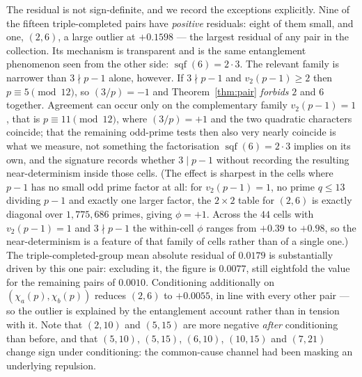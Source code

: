\documentclass[11pt,reqno]{amsart}
\theoremstyle{plain}
\theoremstyle{definition}
\DeclareMathOperator{\sqf}{sqf}
\begin{document}
The residual is not sign-definite, and we record the exceptions explicitly.
Nine of the fifteen triple-completed pairs have \emph{positive} residuals: eight of
them small, and one, $(2,6)$, a large outlier at $+0.1598$ --- the largest
residual of any pair in the collection. Its mechanism is transparent and is the same
entanglement phenomenon seen from the other side: $\sqf(6) = 2 \cdot 3$. The relevant family is narrower than $3 \nmid p-1$ alone, however. If $3 \nmid p-1$ and $v_2(p-1) \ge 2$ then $p \equiv 5 \pmod{12}$, so $(3/p) = -1$ and Theorem~\ref{thm:pair} \emph{forbids} $2$ and $6$ together. Agreement can occur only on the complementary family $v_2(p-1) = 1$, that is $p \equiv 11 \pmod{12}$, where $(3/p) = +1$ and the two quadratic characters coincide; that the remaining odd-prime tests then also very nearly coincide is what we measure, not something the factorisation $\sqf(6) = 2 \cdot 3$ implies on its own, and the signature records whether $3 \mid p-1$ without recording the
resulting near-determinism inside those cells. (The effect is sharpest in the cells where $p-1$ has no small odd prime factor
at all: for $v_2(p-1) = 1$, no prime $q \le 13$ dividing $p-1$ and exactly one
larger factor, the $2 \times 2$ table for $(2,6)$ is exactly diagonal over
$1{,}775{,}686$ primes, giving $\phi = +1$. Across the $44$ cells with
$v_2(p-1) = 1$ and $3 \nmid p-1$ the within-cell $\phi$ ranges from $+0.39$ to
$+0.98$, so the near-determinism is a feature of that family of cells rather
than of a single one.) The triple-completed-group mean absolute residual of $0.0179$ is
substantially driven by this one pair: excluding it, the figure is $0.0077$,
still eightfold the value for the remaining pairs of $0.0010$. Conditioning
additionally on $(\chi_a(p), \chi_b(p))$ reduces $(2,6)$ to $+0.0055$, in line
with every other pair --- so the outlier is explained by the entanglement
account rather than in tension with it.
Note that $(2,10)$ and $(5,15)$ are more negative \emph{after} conditioning
than before, and that $(5,10)$, $(5,15)$, $(6,10)$, $(10,15)$ and $(7,21)$
change sign under conditioning: the common-cause channel had been masking an
underlying repulsion.
\end{document}
